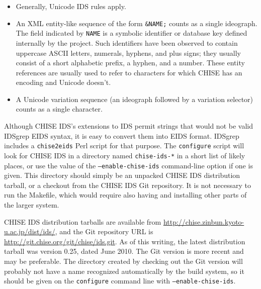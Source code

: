 \documentclass[twocolumn]{report}
\begin{document}
\begin{itemize}
\item Generally, Unicode IDS rules apply.
\item An XML entity-like sequence of the form \texttt{\&NAME;} counts as a
single ideograph.  The field indicated by \texttt{NAME} is a symbolic
identifier or database key defined internally by the project.  Such
identifiers have been observed to contain uppercase ASCII letters, numerals,
hyphens, and plus signs; they usually consist of a short alphabetic
prefix, a hyphen, and a number.  These entity references are usually used to
refer to characters for which CHISE has an encoding and Unicode doesn't.
\item A Unicode variation sequence (an ideograph followed by a variation
selector) counts as a single character.
\end{itemize}

Although CHISE IDS's extensions to IDS permit strings that would not be
valid IDSgrep EIDS syntax, it is easy to convert them into EIDS format. 
IDSgrep includes a \texttt{chise2eids} Perl script for that purpose.  The
\texttt{configure} script will look for CHISE IDS in a directory named
\texttt{chise-ids-*} in a short list of likely places, or use the value
of the \texttt{--enable-chise-ids} command-line option if one is given. 
This directory should simply be an unpacked CHISE IDS distribution tarball,
or a checkout from the CHISE IDS Git repository.  It is not necessary to run
the Makefile, which would require also having and installing other parts of
the larger system.

CHISE IDS distribution tarballs are available from
\url{http://chise.zinbun.kyoto-u.ac.jp/dist/ids/}, and the Git repository
URL is \url{http://git.chise.org/git/chise/ids.git}.  As of this writing,
the latest distribution tarball was version 0.25, dated June 2010.  The Git
version is more recent and may be preferable.  The directory created by
checking out the Git version will probably not have a name recognized
automatically by the build system, so it should be given on the
\texttt{configure} command line with \texttt{--enable-chise-ids}.
\end{document}
